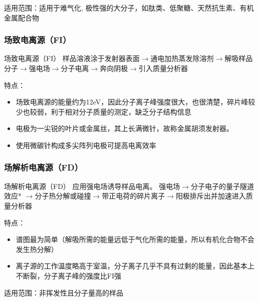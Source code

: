     适用范围：适用于难气化, 极性强的大分子，如肽类、低聚糖、天然抗生素、有机金属配合物    
    
    \subsubsection*{场致电离源（FI）}
   \begin{definition*}{场致电离源（FI）}
    样品溶液涂于发射器表面$\rightarrow$通电加热蒸发除溶剂$\rightarrow$解吸样品分子$\rightarrow$强电场$\rightarrow$分子电离$\rightarrow$奔向阴极$\rightarrow$引入质量分析器
   \end{definition*}
    特点：
    \begin{itemize}
        \item 场致电离源的能量约为12eV，因此分子离子峰强度很大，也很清楚，碎片峰较少也较弱，利于相对分子质量的测定，缺乏分子结构信息
        \item 电极为一尖锐的叶片或金属丝，其上长满微针，故称金属胡须发射器。
        \item 使用微碳针构成多尖阵列电极可提高电离效率
    \end{itemize}

    \subsubsection*{场解析电离源（FD）}
    \begin{definition*}{场解析电离源（FD）}
        应用强电场诱导样品电离。
    强电场$\rightarrow$分子电子的量子隧道效应* $\rightarrow$分子热分解或碰撞$\rightarrow$带正电荷的碎片离子$\rightarrow$阳极排斥出并加速进入质量分析器
    \end{definition*}
   
    特点：
    \begin{itemize}
        \item 谱图最为简单（解吸所需的能量远低于气化所需的能量，所以有机化合物不会发生热分解）
        \item 离子源的工作温度略高于室温，分子离子几乎不具有过剩的能量，因此基本上不断裂，分子离子峰的强度比FI强
    \end{itemize}

    适用范围：非挥发性且分子量高的样品


